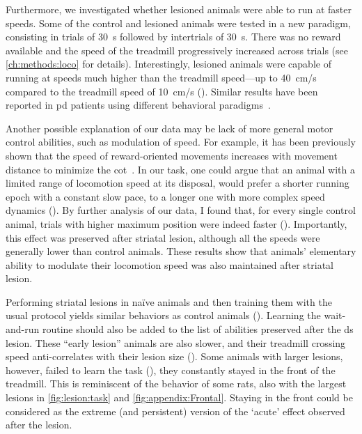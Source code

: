 Furthermore, we investigated whether lesioned animals were able to run at faster speeds.
Some of the control and lesioned animals were tested in a new paradigm, consisting in trials of 30~s followed by intertrials of 30~s.
There was no reward available and the speed of the treadmill progressively increased across trials (see \autoref{ch:methods:loco} for details).
Interestingly, lesioned animals were capable of running at speeds much higher than the treadmill speed---up to 40~cm/s compared to the treadmill speed of 10~cm/s ().
Similar results have been reported in \gls{pd} patients using different behavioral paradigms~\cite{Mazzoni2007, Schmidt2008Brain}.
\par
Another possible explanation of our data may be lack of more general motor control abilities, such as modulation of speed.
For example, it has been previously shown that the speed of reward-oriented movements increases with movement distance to minimize the \gls{cot}~\cite{Shadmehr2010Jneurosci}.
In our task, one could argue that an animal with a limited range of locomotion speed at its disposal, would prefer a shorter running epoch with a constant slow pace, to a longer one with more complex speed dynamics ().
By further analysis of our data, I found that, for every single control animal, trials with higher maximum position were indeed faster ().
Importantly, this effect was preserved after striatal lesion, although all the speeds were generally lower than control animals.
These results show that animals' elementary ability to modulate their locomotion speed was also maintained after striatal lesion.
\par
Performing striatal lesions in na\"{i}ve animals and then training them with the usual protocol yields similar behaviors as control animals ().
Learning the wait-and-run routine should also be added to the list of abilities preserved after the \gls{ds} lesion.
These ``early lesion'' animals are also slower, and their treadmill crossing speed anti-correlates with their lesion size ().
Some animals with larger lesions,  however, failed to learn the task (), they constantly stayed in the front of the treadmill.
This is reminiscent of the behavior of some rats, also with the largest lesions in \autoref{fig:lesion:task} and \autoref{fig:appendix:Frontal}.
Staying in the front could be considered as the extreme (and persistent) version of the `acute' effect observed after the lesion.
